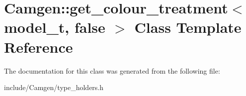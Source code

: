 \hypertarget{a00245}{}\section{Camgen\+:\+:get\+\_\+colour\+\_\+treatment$<$ model\+\_\+t, false $>$ Class Template Reference}
\label{a00245}


The documentation for this class was generated from the following file\+:\begin{DoxyCompactItemize}
\item 
include/\+Camgen/type\+\_\+holders.\+h\end{DoxyCompactItemize}
